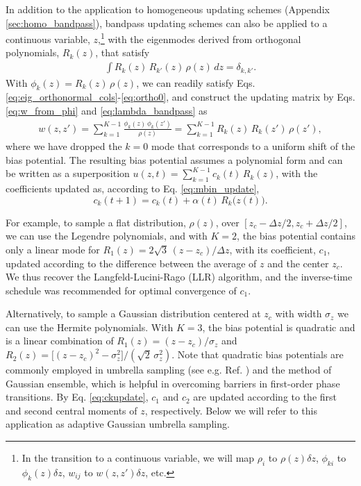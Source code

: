 \documentclass[reprint, superscriptaddress, floatfix]{revtex4-1}
\begin{document}
In addition to the application to homogeneous updating schemes
(Appendix \ref{sec:homo_bandpass}),
bandpass updating schemes can also be applied to
a continuous variable, $z$,\footnote{
  In the transition to a continuous variable,
  we will map
  $\rho_i$ to $\rho(z) \delta z$,
  $\phi_{ki}$ to $\phi_k(z) \delta z$,
  $w_{ij}$ to $w(z, z') \delta z$, etc.}
with the eigenmodes derived from orthogonal polynomials, $R_k(z)$,
that satisfy
\begin{align*}
  \int R_k(z) \, R_{k'}(z) \, \rho(z) \, d z = \delta_{k, k'}
  .
\end{align*}
%
With $\phi_k(z) = R_k(z) \, \rho(z)$,
we can readily satisfy Eqs. \eqref{eq:eig_orthonormal_cols}-\eqref{eq:ortho0},
and construct the updating matrix by
Eqs. \eqref{eq:w_from_phi} and \eqref{eq:lambda_bandpass} as
\begin{align*}
  w(z, z')
  =
  \sum_{k=1}^{K-1} \frac{ \phi_k(z) \, \phi_k(z') } { \rho(z) }
  = \sum_{k=1}^{K-1} R_k(z) \, R_k(z') \, \rho(z'),
\end{align*}
%
where we have dropped the $k=0$ mode
that corresponds to a uniform shift
of the bias potential.
%
The resulting bias potential
assumes a polynomial form
and can be written as a superposition
$u(z, t) = \sum_{k=1}^{K-1} c_k(t) \, R_k(z)$,
with the coefficients updated as, according to Eq. \eqref{eq:mbin_update},
\begin{equation}
  c_k(t+1) = c_k(t) + \alpha(t) \, R_k\bigl( z(t) \bigr)
  .
  \label{eq:ckupdate}
\end{equation}


For example,
to sample a flat distribution, $\rho(z)$,
over $[z_c - \Delta z/2, z_c + \Delta z/2]$,
we can use the Legendre polynomials\cite{arfken},
and with $K = 2$,
the bias potential contains only a linear mode for
$R_1(z) = 2 \sqrt{3} \, (z - z_c)/\Delta z$,
with its coefficient, $c_1$, updated according to
the difference between the average of $z$
and the center $z_c$.
%
We thus recover the Langfeld-Lucini-Rago (LLR)
algorithm\cite{langfeld2012},
and the inverse-time schedule
was recommended for optimal convergence of $c_1$\cite{pellegrini2014}.

Alternatively,
to sample a Gaussian distribution
centered at $z_c$ with width $\sigma_z$
we can use the Hermite polynomials\cite{arfken}.
%
With $K = 3$, the bias potential is quadratic
and is a linear combination of
$R_1(z) = (z - z_c)/\sigma_z$
and
$R_2(z) = \bigl[(z - z_c)^2 - \sigma_z^2\bigr] /\left(\sqrt 2 \, \sigma_z^2\right)$.
%
Note that quadratic bias potentials are commonly employed
in umbrella sampling (see e.g. Ref. \cite{zhu2012})
and the method of Gaussian ensemble\cite{hetherington1987,
*challa1988, *costeniuc2006, neuhaus2006, *neuhaus2007},
which is helpful in overcoming barriers
in first-order phase transitions.
%
By Eq. \eqref{eq:ckupdate},
$c_1$ and $c_2$ are updated
according to the first and second
central moments of $z$, respectively.
%
Below we will refer to this application
as adaptive Gaussian umbrella sampling.
\end{document}
